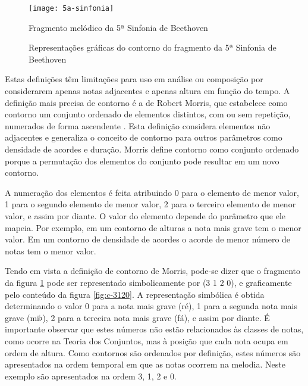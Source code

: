 \begin{figure}
  \centering
  \texttt{[image: 5a-sinfonia]}
  \caption{Fragmento melódico da 5ª Sinfonia de Beethoven}
  \label{fig:5a-sinfonia}
\end{figure}

\begin{figure}
  \centering
  \subfloat[(- + -)]{
    \texttt{[image: c-1010]}
    \label{fig:c-1010}
  }
  \quad
  \subfloat[(3 1 2 0)]{
    \texttt{[image: c-3120]}
    \label{fig:c-3120}
  }
  \caption{Representações gráficas do contorno do fragmento da 5ª
    Sinfonia de Beethoven}
  \label{fig:repr-5a-sinfonia}
\end{figure}

Estas definições têm limitações para uso em análise ou composição por
considerarem apenas notas adjacentes e apenas altura em função do
tempo. A definição mais precisa de contorno é a de Robert Morris, que
estabelece como contorno um conjunto ordenado de elementos distintos,
com ou sem repetição, numerados de forma ascendente
\cite[p. 206]{morris93:directions}. Esta definição considera elementos
não adjacentes e generaliza o conceito de contorno para outros
parâmetros como densidade de acordes e duração. Morris define contorno
como conjunto ordenado porque a permutação dos elementos do conjunto
pode resultar em um novo contorno.

A numeração dos elementos é feita atribuindo 0 para o elemento de
menor valor, 1 para o segundo elemento de menor valor, 2 para o
terceiro elemento de menor valor, e assim por diante. O valor do
elemento depende do parâmetro que ele mapeia. Por exemplo, em um
contorno de alturas a nota mais grave tem o menor valor. Em um
contorno de densidade de acordes o acorde de menor número de notas
tem o menor valor.

Tendo em vista a definição de contorno de Morris, pode-se dizer que o
fragmento da figura \ref{fig:5a-sinfonia} pode ser representado
simbolicamente por (3 1 2 0), e graficamente pelo conteúdo da figura
\ref{fig:c-3120}. A representação simbólica é obtida determinando o
valor 0 para a nota mais grave (ré), 1 para a segunda nota mais grave
(mi$\flat$), 2 para a terceira nota mais grave (fá), e assim por
diante. É importante observar que estes números não estão relacionados
às classes de notas, como ocorre na Teoria dos Conjuntos, mas à
posição que cada nota ocupa em ordem de altura. Como contornos são
ordenados por definição, estes números são apresentados na ordem
temporal em que as notas ocorrem na melodia. Neste exemplo são
apresentados na ordem 3, 1, 2 e 0.


